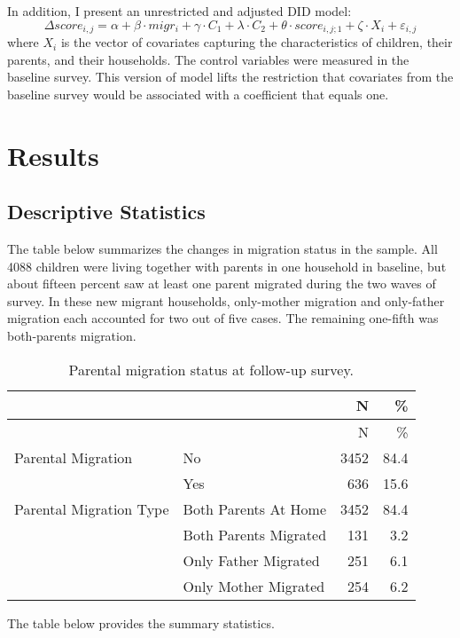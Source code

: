 \documentclass[
  man,floatsintext]{apa7}
\begin{document}
In addition, I present an unrestricted and adjusted DID model: \[\Delta score_{i,j} = \alpha + \beta \cdot migr_{i} + \gamma \cdot C_{1} + \lambda \cdot C_{2} + \theta \cdot score_{i,j;1} + \zeta \cdot X_{i} + \varepsilon_{i,j}\] where \(X_{i}\) is the vector of covariates capturing the characteristics of children, their parents, and their households. The control variables were measured in the baseline survey. This version of model lifts the restriction that covariates from the baseline survey would be associated with a coefficient that equals one.

\newpage

\hypertarget{results}{%
\section{Results}\label{results}}

\hypertarget{descriptive-statistics}{%
\subsection{Descriptive Statistics}\label{descriptive-statistics}}

The table below summarizes the changes in migration status in the sample. All 4088 children were living together with parents in one household in baseline, but about fifteen percent saw at least one parent migrated during the two waves of survey. In these new migrant households, only-mother migration and only-father migration each accounted for two out of five cases. The remaining one-fifth was both-parents migration.

\begin{longtable}[]{@{}llrr@{}}
\caption{Parental migration status at follow-up survey.}\tabularnewline
\toprule
& & N & \% \\
\midrule
\endfirsthead
\toprule
& & N & \% \\
\midrule
\endhead
Parental Migration & No & 3452 & 84.4 \\
& Yes & 636 & 15.6 \\
Parental Migration Type & Both Parents At Home & 3452 & 84.4 \\
& Both Parents Migrated & 131 & 3.2 \\
& Only Father Migrated & 251 & 6.1 \\
& Only Mother Migrated & 254 & 6.2 \\
\bottomrule
\end{longtable}

The table below provides the summary statistics.
\end{document}
